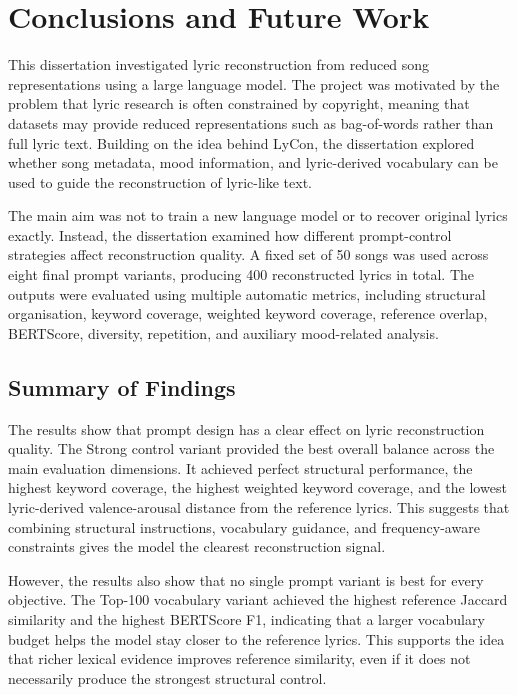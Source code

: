\chapter{Conclusions and Future Work}

This dissertation investigated lyric reconstruction from reduced song representations using a large language model. The project was motivated by the problem that lyric research is often constrained by copyright, meaning that datasets may provide reduced representations such as bag-of-words rather than full lyric text. Building on the idea behind LyCon, the dissertation explored whether song metadata, mood information, and lyric-derived vocabulary can be used to guide the reconstruction of lyric-like text.

The main aim was not to train a new language model or to recover original lyrics exactly. Instead, the dissertation examined how different prompt-control strategies affect reconstruction quality. A fixed set of 50 songs was used across eight final prompt variants, producing 400 reconstructed lyrics in total. The outputs were evaluated using multiple automatic metrics, including structural organisation, keyword coverage, weighted keyword coverage, reference overlap, BERTScore, diversity, repetition, and auxiliary mood-related analysis.

\section{Summary of Findings}

The results show that prompt design has a clear effect on lyric reconstruction quality. The Strong control variant provided the best overall balance across the main evaluation dimensions. It achieved perfect structural performance, the highest keyword coverage, the highest weighted keyword coverage, and the lowest lyric-derived valence-arousal distance from the reference lyrics. This suggests that combining structural instructions, vocabulary guidance, and frequency-aware constraints gives the model the clearest reconstruction signal.

However, the results also show that no single prompt variant is best for every objective. The Top-100 vocabulary variant achieved the highest reference Jaccard similarity and the highest BERTScore F1, indicating that a larger vocabulary budget helps the model stay closer to the reference lyrics. This supports the idea that richer lexical evidence improves reference similarity, even if it does not necessarily produce the strongest structural control.

